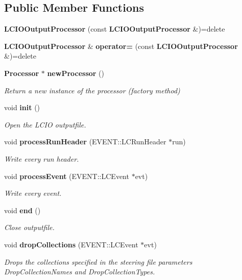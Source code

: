 \subsection*{Public Member Functions}
\begin{DoxyCompactItemize}
\item 
\mbox{\label{classmarlin_1_1LCIOOutputProcessor_a425a069f55fd2f5a304cfb7f281c720c}} 
{\bfseries L\+C\+I\+O\+Output\+Processor} (const \textbf{ L\+C\+I\+O\+Output\+Processor} \&)=delete
\item 
\mbox{\label{classmarlin_1_1LCIOOutputProcessor_a64e6d2939a1e42ed9d1f26365e59b920}} 
\textbf{ L\+C\+I\+O\+Output\+Processor} \& {\bfseries operator=} (const \textbf{ L\+C\+I\+O\+Output\+Processor} \&)=delete
\item 
\mbox{\label{classmarlin_1_1LCIOOutputProcessor_ac53eb5a49c585a26f7177c3841185c97}} 
\textbf{ Processor} $\ast$ \textbf{ new\+Processor} ()
\begin{DoxyCompactList}\small\item\em Return a new instance of the processor (factory method) \end{DoxyCompactList}\item 
\mbox{\label{classmarlin_1_1LCIOOutputProcessor_a23c540ec3d9be10fc4e4b5431bfe64e4}} 
void \textbf{ init} ()
\begin{DoxyCompactList}\small\item\em Open the L\+C\+IO outputfile. \end{DoxyCompactList}\item 
\mbox{\label{classmarlin_1_1LCIOOutputProcessor_af7db9cfb92e19cff720c5171af86a4c8}} 
void \textbf{ process\+Run\+Header} (E\+V\+E\+N\+T\+::\+L\+C\+Run\+Header $\ast$run)
\begin{DoxyCompactList}\small\item\em Write every run header. \end{DoxyCompactList}\item 
\mbox{\label{classmarlin_1_1LCIOOutputProcessor_a07ab3e9f18f80ad76372cdfa17b674e2}} 
void \textbf{ process\+Event} (E\+V\+E\+N\+T\+::\+L\+C\+Event $\ast$evt)
\begin{DoxyCompactList}\small\item\em Write every event. \end{DoxyCompactList}\item 
\mbox{\label{classmarlin_1_1LCIOOutputProcessor_a03a7ac4d65110b0555dbfdec51a819a1}} 
void \textbf{ end} ()
\begin{DoxyCompactList}\small\item\em Close outputfile. \end{DoxyCompactList}\item 
\mbox{\label{classmarlin_1_1LCIOOutputProcessor_a861bcbba9e0af1094af55672a3ce0067}} 
void \textbf{ drop\+Collections} (E\+V\+E\+N\+T\+::\+L\+C\+Event $\ast$evt)
\begin{DoxyCompactList}\small\item\em Drops the collections specified in the steering file parameters Drop\+Collection\+Names and Drop\+Collection\+Types. \end{DoxyCompactList}\end{DoxyCompactItemize}
